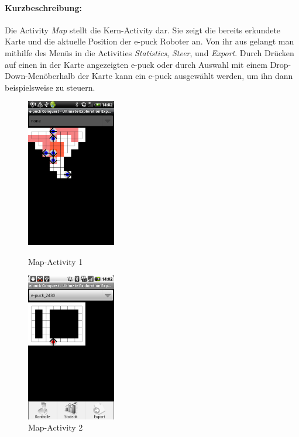 \documentclass[10pt,a4paper]{article}
\begin{document}
 		\paragraph{Kurzbeschreibung:}
 		Die Activity \textit{Map} stellt die Kern-Activity dar. Sie zeigt die bereits erkundete Karte und die aktuelle Position der e-puck Roboter an. Von ihr aus gelangt man
 		mithilfe des Men\"us in die Activities \textit{Statistics}, \textit{Steer}, und \textit{Export}. Durch Dr\"ucken auf einen in der Karte angezeigten e-puck oder durch 
 		Auswahl mit einem Drop-Down-Men\" oberhalb der Karte kann ein e-puck ausgew\"ahlt werden, um ihn dann beispielsweise zu steuern.
 		\begin{figure}[htbp]
				\begin{minipage}[t]{6cm}
					\vspace{10pt}
					\includegraphics[height=6.5cm]{images/map.png} 
					\caption{Map-Activity 1}
				\end{minipage}
				\hfill
				\begin{minipage}[t]{6cm}
					\vspace{10pt}
					\includegraphics[height=6.5cm]{images/map2.png} 
					\caption{Map-Activity 2}
				\end{minipage}
   			\end{figure} 	 			
 		
\end{document}
